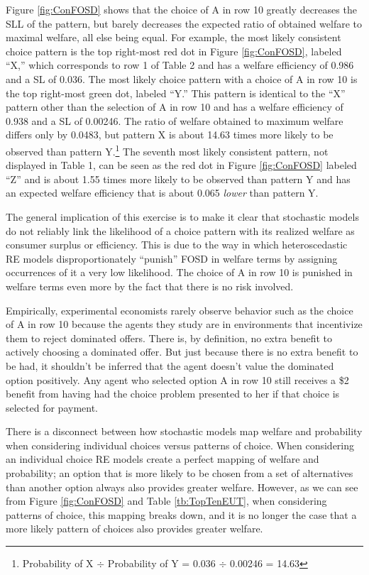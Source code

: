 \documentclass[../main.tex]{subfiles}
\begin{document}
Figure \ref{fig:ConFOSD} shows that the choice of A in row 10 greatly decreases the SLL of the pattern, but barely decreases the expected ratio of obtained welfare to maximal welfare, all else being equal.
For example, the most likely consistent choice pattern is the top right-most red dot in Figure \ref{fig:ConFOSD}, labeled \enquote{X,} which corresponds to row 1 of Table 2 and has a welfare efficiency of 0.986 and a SL of 0.036.
The most likely choice pattern with a choice of A in row 10 is the top right-most green dot, labeled \enquote{Y.}
This pattern is identical to the \enquote{X} pattern other than the selection of A in row 10 and has a welfare efficiency of 0.938 and a SL of 0.00246.
The ratio of welfare obtained to maximum welfare differs only by 0.0483, but pattern X is about 14.63 times more likely to be observed than pattern Y.\footnote{
	Probability of X $\div$ Probability of Y = 0.036 $\div$ 0.00246 = 14.63
}
The seventh most likely consistent pattern, not displayed in Table 1, can be seen as the red dot in Figure \ref{fig:ConFOSD} labeled \enquote{Z} and is about 1.55 times more likely to be observed than pattern Y and has an expected welfare efficiency that is about 0.065 \textit{lower} than pattern Y.

The general implication of this exercise is to make it clear that stochastic models do not reliably link the likelihood of a choice pattern with its realized welfare as consumer surplus or efficiency.
This is due to the way in which heteroscedastic RE models disproportionately \enquote{punish} FOSD in welfare terms by assigning occurrences of it a very low likelihood.
The choice of A in row 10 is punished in welfare terms even more by the fact that there is no risk involved.

Empirically, experimental economists rarely observe behavior such as the choice of A in row 10 because the agents they study are in environments that incentivize them to reject dominated offers.
There is, by definition, no extra benefit to actively choosing a dominated offer.
But just because there is no extra benefit to be had, it shouldn't be inferred that the agent doesn't value the dominated option positively.
Any agent who selected option A in row 10 still receives a \$2 benefit from having had the choice problem presented to her if that choice is selected for payment.

There is a disconnect between how stochastic models map welfare and probability when considering individual choices versus patterns of choice.
When considering an individual choice RE models create a perfect mapping of welfare and probability; an option that is more likely to be chosen from a set of alternatives than another option always also provides greater welfare.
However, as we can see from Figure \ref{fig:ConFOSD} and Table \ref{tb:TopTenEUT}, when considering patterns of choice, this mapping breaks down, and it is no longer the case that a more likely pattern of choices also provides greater welfare.
\end{document}
